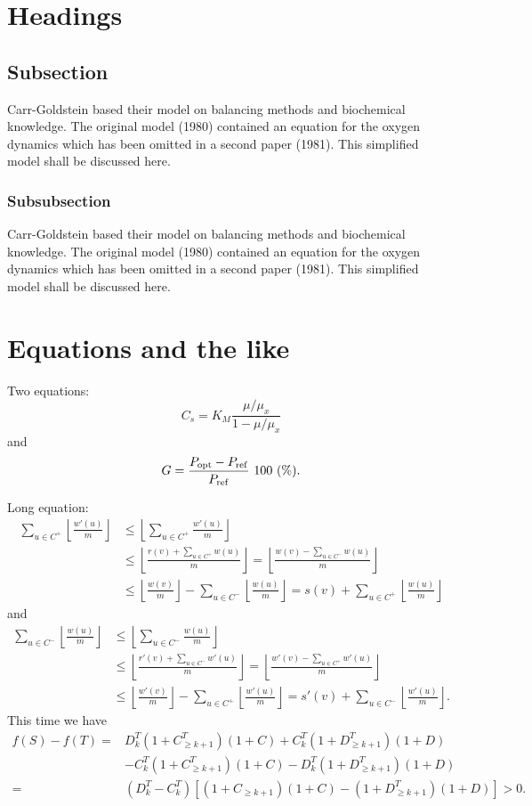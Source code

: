 \documentclass[amsa]{ipart}
\def\SM#1#2{\sum_{#1\in #2}}
\def\FL#1{\left\lfloor #1 \right\rfloor}
\def\FR#1#2{{\frac{#1}{#2}}}
\begin{document}
\section{Headings}

\subsection{Subsection}
Carr-Goldstein based their model on balancing methods and
biochemical know\-ledge. The original model (1980) contained an equation for the
oxygen dynamics which has been omitted in a second paper
(1981). This simplified model shall be discussed here.

\subsubsection{Subsubsection}
Carr-Goldstein
based their model on balancing methods and
biochemical know\-ledge. The original model (1980) contained an equation for the
oxygen dynamics which has been omitted in a second paper
(1981). This simplified model shall be discussed here.

\section{Equations and the like}

Two equations:
\begin{equation}
    C_{s}  =  K_{M} \frac{\mu/\mu_{x}}{1-\mu/\mu_{x}} \label{ccs}
\end{equation}
and
\begin{equation}
    G = \frac{P_{\rm opt} - P_{\rm ref}}{P_{\rm ref}} \mbox{\ }100 \mbox{\ }(\%).
\end{equation}

Long equation:
\begin{align}
\SM u{C^+}\FL{\FR{w'(u)}m}&\le \FL{\SM u{C^+} \FR{w'(u)}m}\nonumber\\ &\le
\FL{\FR{r(v)+\SM u{C^+} w(u)}m} = \FL{\FR{w(v)-\SM u{C^-} w(u)}m}\nonumber\\
&\le \FL{\FR{w(v)}m}-\SM u{C^-}\FL{\FR{w(u)}m}
= s(v)+\SM u{C^+}\FL{\FR{w(u)}m}
\end{align}
and
\begin{align}
\SM u{C^-}\FL{\FR{w(u)}m}&\le \FL{\SM u{C^-} \FR{w(u)}m}\nonumber\\ & \le
\FL{\FR{r'(v)+\SM u{C^-} w'(u)}m} = \FL{\FR{w'(v)-\SM u{C^+} w'(u)}m}\nonumber\\
&\le \FL{\FR{w'(v)}m}-\SM u{C^+}\FL{\FR{w'(u)}m}
= s'(v)+\SM u{C^-}\FL{\FR{w'(u)}m}.
\end{align}
This time we have
\begin{align*}
f(S)-f(T) =    {}  &  D_k^T(1+C_{\geq k+1}^T)(1 + C) + C_k^T(1+D_{\geq k+1}^T)(1 + D) \\
        {}   &  - C_k^T(1+C_{\geq k+1}^T)(1 + C) - D_k^T(1+D_{\geq k+1}^T)(1 + D)   \\
=     {} &   (D_k^T-C_k^T)[(1+C_{\geq k+1})(1+C)-(1+D_{\geq
k+1}^T)(1+D)]>0.
\end{align*}
\end{document}
